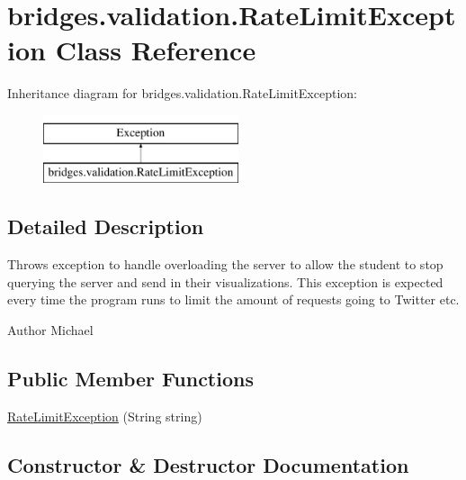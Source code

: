 \hypertarget{classbridges_1_1validation_1_1_rate_limit_exception}{}\section{bridges.\+validation.\+Rate\+Limit\+Exception Class Reference}
\label{classbridges_1_1validation_1_1_rate_limit_exception}
Inheritance diagram for bridges.\+validation.\+Rate\+Limit\+Exception\+:\begin{figure}[H]
\begin{center}
\leavevmode
\includegraphics[height=2.000000cm]{classbridges_1_1validation_1_1_rate_limit_exception}
\end{center}
\end{figure}


\subsection{Detailed Description}
Throws exception to handle overloading the server to allow the student to stop querying the server and send in their visualizations. This exception is expected every time the program runs to limit the amount of requests going to Twitter etc.

\begin{DoxyAuthor}{Author}
Michael 
\end{DoxyAuthor}
\subsection*{Public Member Functions}
\begin{DoxyCompactItemize}
\item 
\hyperlink{classbridges_1_1validation_1_1_rate_limit_exception_a8375495a80a80213fe9201921c43afbc}{Rate\+Limit\+Exception} (String string)
\end{DoxyCompactItemize}


\subsection{Constructor \& Destructor Documentation}
\mbox{\label{classbridges_1_1validation_1_1_rate_limit_exception_a8375495a80a80213fe9201921c43afbc}} 
